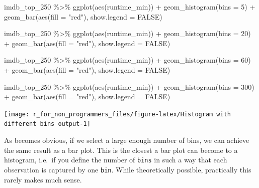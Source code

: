 \documentclass[
]{book}
\newenvironment{Shaded}{\begin{snugshade}}{\end{snugshade}}
\newcommand{\AttributeTok}[1]{\textcolor[rgb]{0.77,0.63,0.00}{#1}}
\newcommand{\ConstantTok}[1]{\textcolor[rgb]{0.00,0.00,0.00}{#1}}
\newcommand{\DecValTok}[1]{\textcolor[rgb]{0.00,0.00,0.81}{#1}}
\newcommand{\FunctionTok}[1]{\textcolor[rgb]{0.00,0.00,0.00}{#1}}
\newcommand{\NormalTok}[1]{#1}
\newcommand{\SpecialCharTok}[1]{\textcolor[rgb]{0.00,0.00,0.00}{#1}}
\newcommand{\StringTok}[1]{\textcolor[rgb]{0.31,0.60,0.02}{#1}}
\begin{document}
\begin{Shaded}
\begin{Highlighting}[]
\NormalTok{imdb\_top\_250 }\SpecialCharTok{\%\textgreater{}\%} 
  \FunctionTok{ggplot}\NormalTok{(}\FunctionTok{aes}\NormalTok{(runtime\_min)) }\SpecialCharTok{+}
  \FunctionTok{geom\_histogram}\NormalTok{(}\AttributeTok{bins =} \DecValTok{5}\NormalTok{) }\SpecialCharTok{+}
  \FunctionTok{geom\_bar}\NormalTok{(}\FunctionTok{aes}\NormalTok{(}\AttributeTok{fill =} \StringTok{"red"}\NormalTok{), }\AttributeTok{show.legend =} \ConstantTok{FALSE}\NormalTok{)}

\NormalTok{imdb\_top\_250 }\SpecialCharTok{\%\textgreater{}\%} 
  \FunctionTok{ggplot}\NormalTok{(}\FunctionTok{aes}\NormalTok{(runtime\_min)) }\SpecialCharTok{+}
  \FunctionTok{geom\_histogram}\NormalTok{(}\AttributeTok{bins =} \DecValTok{20}\NormalTok{) }\SpecialCharTok{+}
  \FunctionTok{geom\_bar}\NormalTok{(}\FunctionTok{aes}\NormalTok{(}\AttributeTok{fill =} \StringTok{"red"}\NormalTok{), }\AttributeTok{show.legend =} \ConstantTok{FALSE}\NormalTok{)}

\NormalTok{imdb\_top\_250 }\SpecialCharTok{\%\textgreater{}\%} 
  \FunctionTok{ggplot}\NormalTok{(}\FunctionTok{aes}\NormalTok{(runtime\_min)) }\SpecialCharTok{+}
  \FunctionTok{geom\_histogram}\NormalTok{(}\AttributeTok{bins =} \DecValTok{60}\NormalTok{) }\SpecialCharTok{+}
  \FunctionTok{geom\_bar}\NormalTok{(}\FunctionTok{aes}\NormalTok{(}\AttributeTok{fill =} \StringTok{"red"}\NormalTok{), }\AttributeTok{show.legend =} \ConstantTok{FALSE}\NormalTok{)}

\NormalTok{imdb\_top\_250 }\SpecialCharTok{\%\textgreater{}\%} 
  \FunctionTok{ggplot}\NormalTok{(}\FunctionTok{aes}\NormalTok{(runtime\_min)) }\SpecialCharTok{+}
  \FunctionTok{geom\_histogram}\NormalTok{(}\AttributeTok{bins =} \DecValTok{300}\NormalTok{) }\SpecialCharTok{+}
  \FunctionTok{geom\_bar}\NormalTok{(}\FunctionTok{aes}\NormalTok{(}\AttributeTok{fill =} \StringTok{"red"}\NormalTok{), }\AttributeTok{show.legend =} \ConstantTok{FALSE}\NormalTok{)}
\end{Highlighting}
\end{Shaded}

\begin{center}\texttt{[image: r\_for\_non\_programmers\_files/figure-latex/Histogram with different bins output-1]} \end{center}

As becomes obvious, if we select a large enough number of bins, we can achieve the same result as a bar plot. This is the closest a bar plot can become to a histogram, i.e.~if you define the number of \texttt{bins} in such a way that each observation is captured by one \texttt{bin}. While theoretically possible, practically this rarely makes much sense.
\end{document}

